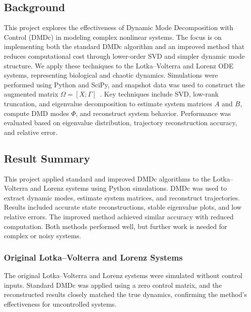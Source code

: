 \documentclass[a4paper,12pt]{report}
\theoremstyle{definition}
\numberwithin{equation}{section}
\begin{document}
\subsection*{Background}

This project explores the effectiveness of Dynamic Mode Decomposition with Control (DMDc) in modeling complex nonlinear systems. The focus is on implementing both the standard DMDc algorithm and an improved method that reduces computational cost through lower-order SVD and simpler dynamic mode structure\cite{bai2020}. We apply these techniques to the Lotka–Volterra and Lorenz ODE systems, representing biological and chaotic dynamics. Simulations were performed using Python and SciPy, and snapshot data was used to construct the augmented matrix $\Omega = [X; \Gamma]$\ \cite{dawson2015}. Key techniques include SVD, low-rank truncation, and eigenvalue decomposition to estimate system matrices $A$ and $B$, compute DMD modes $\Phi$, and reconstruct system behavior. Performance was evaluated based on eigenvalue distribution, trajectory reconstruction accuracy, and relative error\cite{fonzi2020}.

\subsection*{Result Summary}
This project applied standard and improved DMDc algorithms to the Lotka–Volterra and Lorenz systems using Python simulations. DMDc was used to extract dynamic modes, estimate system matrices, and reconstruct trajectories\cite{A2}. Results included accurate state reconstructions, stable eigenvalue plots, and low relative errors. The improved method achieved similar accuracy with reduced computation. Both methods performed well, but further work is needed for complex or noisy systems.

\subsubsection*{Original Lotka–Volterra and Lorenz Systems}
The original Lotka–Volterra and Lorenz systems were simulated without control inputs. Standard DMDc was applied using a zero control matrix, and the reconstructed results closely matched the true dynamics, confirming the method’s effectiveness for uncontrolled systems\cite{liew2022}.
\end{document}
